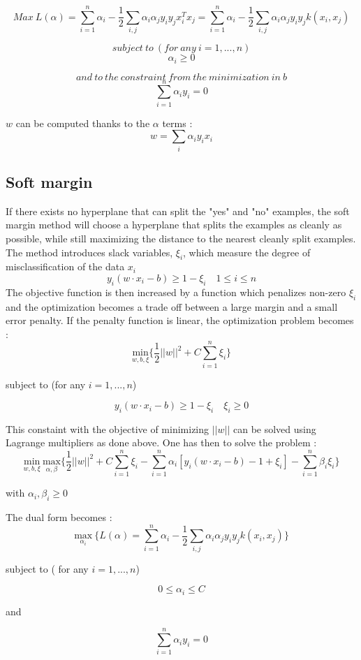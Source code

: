 \[Max\ L(\alpha) = \sum_{i=1}^n \alpha_i - \frac{1}{2} \sum_{i,j} \alpha_i \alpha_j y_i y_j x_i^T x_j = \sum_{i=1}^n \alpha_i - \frac{1}{2} \sum_{i,j} \alpha_i \alpha_j y_i y_j k(x_i,x_j)\] 

\[subject\ to\ ( for\ any\ i = 1,...,n  )\]
\[\alpha_i \geq 0\]

\[and\ to\ the\ constraint\ from\ the\ minimization\ in\ b\]
\[\sum_{i=1}^n \alpha_i y_i =0\]


$w$ can be computed thanks to the $\alpha$ terms : \[w=\sum_i \alpha_i y_i x_i\]


\subsection{Soft margin}

If there exists no hyperplane that can split the "yes" and "no" examples, the soft margin method will choose a hyperplane that splits the examples as cleanly as possible, while still maximizing the distance to the nearest cleanly split examples. The method introduces slack variables, $\xi_i$, which measure the degree of misclassification of the data $x_i$
\[y_i(w \cdot x_i - b) \geq 1 - \xi_i \quad 1 \leq i \leq n\]
The objective function is then increased by a function which penalizes non-zero $\xi_i$ and the optimization becomes a trade off between a large margin and a small error penalty. If the penalty function is linear, the optimization problem becomes : 
\[\underset{w,b,\xi}{\text{min}}\{\frac{1}{2} ||w||^2 + C\sum_{i=1}^n \xi_i \}\]
\begin{center}subject to (for any $i=1,...,n$)\end{center}
\[y_i ( w \cdot x_i - b) \geq 1 - \xi_i \quad \xi_i \geq 0\]

This constaint with the objective of minimizing $||w||$ can be solved using Lagrange multipliers as done above. One has then to solve the problem :
\[\underset{w,b,\xi}{\text{min}}\ \underset{\alpha,\beta}{\text{max}}\{\frac{1}{2} ||w||^2 + C\sum_{i=1}^n \xi_i - \sum_{i=1}^n \alpha_i[y_i(w \cdot x_i - b)-1 +\xi_i]- \sum_{i=1}^n \beta_i\xi_i \} \] 
\begin{center} with $\alpha_i , \beta_i \geq 0$ \end{center}

The dual form becomes : 
\[\underset{\alpha_i}{\text{max}}\ \{L(\alpha) = \sum_{i=1}^n \alpha_i - \frac{1}{2} \sum_{i,j} \alpha_i \alpha_j y_i y_j k(x_i,x_j)\}\]
\begin{center} subject to ( for any $i=1,...,n$) \end{center}
\[0 \leq \alpha_i \leq C\]
\begin{center} and \end{center}
\[\sum_{i=1}^n \alpha_i y_i = 0\]

